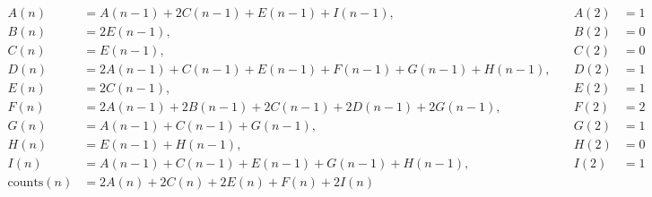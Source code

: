\documentclass{article}
\begin{document}
\begin{align*}
A(n) &= A(n-1) + 2C(n-1) + E(n-1) + I(n-1), \quad &A(2) &= 1 \\
B(n) &= 2E(n-1), \quad &B(2) &= 0 \\
C(n) &= E(n-1), \quad &C(2) &= 0 \\
D(n) &= 2A(n-1) + C(n-1) + E(n-1) + F(n-1) + G(n-1) + H(n-1), \quad &D(2) &= 1 \\
E(n) &= 2C(n-1), \quad &E(2) &= 1 \\
F(n) &= 2A(n-1) + 2B(n-1) + 2C(n-1) + 2D(n-1) + 2G(n-1), \quad &F(2) &= 2 \\
G(n) &= A(n-1) + C(n-1) + G(n-1), \quad &G(2) &= 1 \\
H(n) &= E(n-1) + H(n-1), \quad &H(2) &= 0 \\
I(n) &= A(n-1) + C(n-1) + E(n-1) + G(n-1) + H(n-1), \quad &I(2) &= 1 \\
\text{counts}(n) &= 2A(n) + 2C(n) + 2E(n) + F(n) + 2I(n)
\end{align*}
\end{document}
